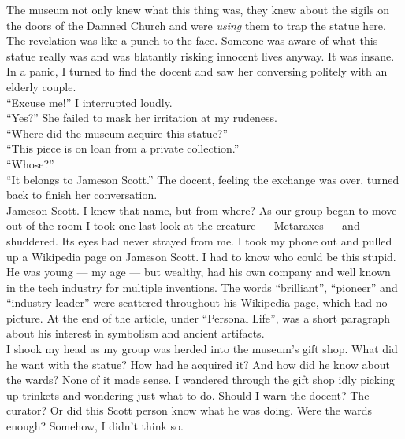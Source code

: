 \documentclass[a5paper]{scrartcl}
\begin{document}
The museum not only knew what this thing was, they knew about the sigils on the doors of the Damned Church and were \textit{using}
 them to trap the statue here. The revelation was like a punch to the face. Someone was aware of what this statue really was and was blatantly risking innocent lives anyway. It was insane.\\


In a panic, I turned to find the docent and saw her conversing politely with an elderly couple. \\


\enquote{Excuse me!} I interrupted loudly. \\


\enquote{Yes?} She failed to mask her irritation at my rudeness.\\


\enquote{Where did the museum acquire this statue?}\\


\enquote{This piece is on loan from a private collection.}\\


\enquote{Whose?}\\


\enquote{It belongs to Jameson Scott.} The docent, feeling the exchange was over, turned back to finish her conversation. \\


Jameson Scott. I knew that name, but from where? As our group began to move out of the room I took one last look at the creature --- Metaraxes --- and shuddered. Its eyes had never strayed from me. I took my phone out and pulled up a Wikipedia page on Jameson Scott. I had to know who could be this stupid.\\


He was young --- my age --- but wealthy, had his own company and well known in the tech industry for multiple inventions. The words \enquote{brilliant}, \enquote{pioneer} and \enquote{industry leader} were scattered throughout his Wikipedia page, which had no picture. At the end of the article, under \enquote{Personal Life}, was a short paragraph about his interest in symbolism and ancient artifacts.\\


I shook my head as my group was herded into the museum's gift shop. What did he want with the statue? How had he acquired it? And how did he know about the wards? None of it made sense. I wandered through the gift shop idly picking up trinkets and wondering just what to do. Should I warn the docent? The curator? Or did this Scott person know what he was doing.  Were the wards enough? Somehow, I didn't think so.\\
\end{document}
